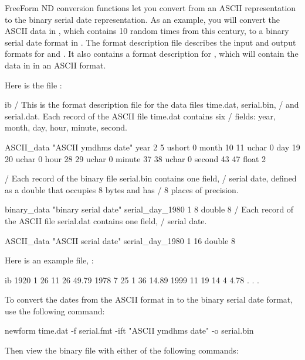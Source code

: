 FreeForm ND conversion functions let you convert from an ASCII
representation to the binary serial date representation. As an
example, you will convert the ASCII data in , which contains
10 random times from this century, to a binary serial date format in
. The format description file  describes the input
and output formats for  and . It also contains a
format description for , which will contain the data in
 in an ASCII format.

Here is the file :

\begin{vcode}{ib}
/ This is the format description file for the data files time.dat, serial.bin, 
/ and serial.dat. Each record of the ASCII file time.dat contains six 
/ fields: year, month, day, hour, minute, second.

ASCII_data "ASCII ymdhms date"
year 2 5 ushort 0
month 10 11 uchar 0
day 19 20 uchar 0
hour 28 29 uchar 0
minute 37 38 uchar 0
second 43 47 float 2

/ Each record of the binary file serial.bin contains one field, 
/ serial date, defined as a double that occupies 8 bytes and has 
/ 8 places of precision.

binary_data "binary serial date"
serial_day_1980 1 8 double 8
/ Each record of the ASCII file serial.dat contains one field, 
/ serial date.

ASCII_data "ASCII serial date"
serial_day_1980 1 16 double 8
\end{vcode}

Here is an example file, :

\begin{vcode}{ib}
1920     1       26       11       26    49.79
1978     7       25        1       36    14.89
1999    11       19       14        4     4.78
                    .
                    .
                    . 
\end{vcode}

To convert the dates from the ASCII format in  to the binary
serial date format, use the following command:

\begin{example}
newform time.dat -f serial.fmt -ift "ASCII ymdhms date"  -o serial.bin 
\end{example}

Then view the binary file  with either of the following
commands:

